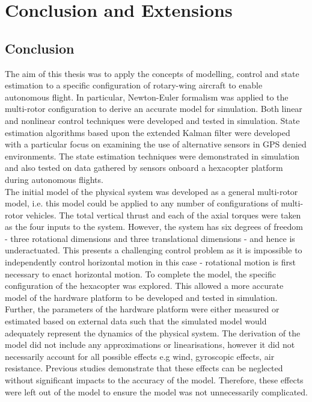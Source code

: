 
\chapter{Conclusion and Extensions}

\section{Conclusion}
The aim of this thesis was to apply the concepts of modelling, control and state estimation to a specific configuration of rotary-wing aircraft to enable autonomous flight. In particular, Newton-Euler formalism was applied to the multi-rotor configuration to derive an accurate model for simulation. Both linear and nonlinear control techniques were developed and tested in simulation. State estimation algorithms based upon the extended Kalman filter were developed with a particular focus on examining the use of alternative sensors in GPS denied environments. The state estimation techniques were demonstrated in simulation and also tested on data gathered by sensors onboard a hexacopter platform during autonomous flights.\\


The initial model of the physical system was developed as a general multi-rotor model, i.e. this model could be applied to any number of configurations of multi-rotor vehicles. The total vertical thrust and each of the axial torques were taken as the four inputs to the system. However, the system has six degrees of freedom - three rotational dimensions and three translational dimensions - and hence is underactuated. This presents a challenging control problem as it is impossible to independently control horizontal motion in this case - rotational motion is first necessary to enact horizontal motion. To complete the model, the specific configuration of the hexacopter was explored. This allowed a more accurate model of the hardware platform to be developed and tested in simulation. Further, the parameters of the hardware platform were either measured or estimated based on external data such that the simulated model would adequately represent the dynamics of the physical system. The derivation of the model did not include any approximations or linearisations, however it did not necessarily account for all possible effects e.g wind, gyroscopic effects, air resistance. Previous studies demonstrate that these effects can be neglected without significant impacts to the accuracy of the model. Therefore, these effects were left out of the model to ensure the model was not unnecessarily complicated.\\

